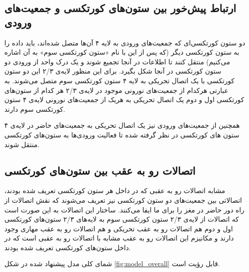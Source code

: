 \documentclass[12pt]{report}
\begin{document}
	
	\subsection{ارتباط پیش‌خور بین ستون‌های کورتکسی و جمعیت‌های ورودی}
	
	دو ستون کورتکسی‌ای که جمعیت‌های ورودی به لایه ۴ آن‌ها متصل شده‌اند، باید داده را به ستون کورتکسی دیگر (که پس از این با نام «ستون کورتکسی سوم» به آن اشاره می‌کنیم) منتقل کنند تا اطلاعات در آنجا تجمیع شوند و یک درک واحد از ورودی دو ستون کورتکسی در آنجا شکل بگیرد. برای این منظور لایه‌ی ۲/۳ این دو ستون کورتکسی با یک اتصال تحریکی به لایه ۴ ستون کورتکسی سوم متصل می‌شوند. به عبارتی هرکدام از جمعیت‌های نورونی موجود در لایه‌ی ۲/۳ هر کدام از ستون‌های کورتکسی اول و دوم یک اتصال تحریکی به هر‌یک از جمعیت‌های نورونی لایه‌ی ۴ ستون کورتکسی سوم دارند. 
	
	همچنین از جمعیت‌های ورودی نیز یک اتصال تحریکی به جمعیت‌های حاضر در لایه‌ی ۴ ستون ‌های کورتکسی در نظر گرفته شده تا فعالیت ورودی‌ها به ستون‌های کورتکسی منتقل شوند.
	
	\subsection{اتصالات رو‌ به عقب بین ستون‌های کورتکسی}
	
	مشابه اتصالات رو به عقبی که در داخل هر ستون کورتکسی تعریف شده بودند، اتصالاتی بین جمعیت‌های دو ستون کورتکسی نیز تعریف می‌شوند که نقش اتصالات از راه دور حاضر در مغز را برای ما ایفا می‌کنند. ساختار این اتصالات به این صورت است که اتصالات از لایه‌ی ۲/۳ ستون کورتکسی سوم به لایه‌های ۲/۳ ستون‌های کورتکسی اول و دوم هم اتصالات رو به عقب تحریکی و هم اتصالات رو به عقب مهاری وجود دارند و مکانیزم این اتصالات رو به عقب مشابه با اتصالات رو به عقبی است که در داخل ستون‌های کورتکسی تعریف شده بودند.
	
	شمای کلی مدل پیشنهاد شده در شکل \ref{fig:model_overall} قابل رؤیت است.
	
\end{document}
